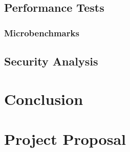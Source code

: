 \documentclass[12pt,a4paper,twoside,openright]{report}
\begin{document}
\section{Performance Tests}

\subsection{Microbenchmarks}

\section{Security Analysis}

\chapter{Conclusion}




\appendix

\chapter{Project Proposal}


\end{document}
